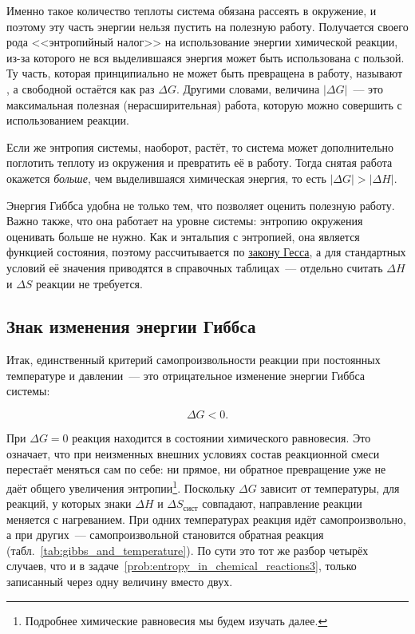 Именно такое количество теплоты система обязана рассеять в окружение, и поэтому эту часть энергии нельзя пустить на полезную работу. Получается своего рода <<энтропийный налог>> на использование энергии химической реакции, из-за которого не вся выделившаяся энергия может быть использована с пользой. Ту часть, которая принципиально не может быть превращена в работу, называют , а свободной остаётся как раз $\Delta G$. Другими словами, величина $\left| \Delta G \right|$~--- это максимальная полезная (нерасширительная) работа, которую можно совершить с использованием реакции.

Если же энтропия системы, наоборот, растёт, то система может дополнительно поглотить теплоту из окружения и превратить её в работу. Тогда снятая работа окажется \emph{больше}, чем выделившаяся химическая энергия, то есть $\left| \Delta G \right| > \left| \Delta H \right|$.

Энергия Гиббса удобна не только тем, что позволяет оценить полезную работу. Важно также, что она работает на уровне системы: энтропию окружения оценивать больше не нужно. Как и энтальпия с энтропией, она является функцией состояния, поэтому рассчитывается по \hyperref[term:law_of_Hess]{закону Гесса}, а для стандартных условий её значения приводятся в справочных таблицах~--- отдельно считать $\Delta H$ и $\Delta S$ реакции не требуется.

\subsection*{Знак изменения энергии Гиббса}

Итак, единственный критерий самопроизвольности реакции при постоянных температуре и давлении~--- это отрицательное изменение энергии Гиббса системы:

\begin{equation*}
    \Delta G < 0.
\end{equation*}

При $\Delta G = 0$ реакция находится в состоянии химического равновесия. Это означает, что при неизменных внешних условиях состав реакционной смеси перестаёт меняться сам по себе: ни прямое, ни обратное превращение уже не даёт общего увеличения энтропии\footnote{Подробнее химические равновесия мы будем изучать далее.}. Поскольку $\Delta G$ зависит от температуры, для реакций, у которых знаки $\Delta H$ и $\Delta S_{\text{сист}}$ совпадают, направление реакции меняется с нагреванием. При одних температурах реакция идёт самопроизвольно, а при других~--- самопроизвольной становится обратная реакция (табл.~\ref{tab:gibbs_and_temperature}). По сути это тот же разбор четырёх случаев, что и в задаче~\ref{prob:entropy_in_chemical_reactions3}, только записанный через одну величину вместо двух.

